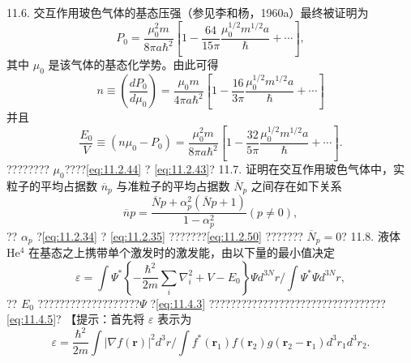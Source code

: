 11.6. 交互作用玻色气体的基态压强（参见李和杨，1960a）最终被证明为
\begin{equation}\tag{11.6.90}\label{eq:11.6.90}
P _ { 0 } = \frac { \mu _ { 0 } ^{2} m } { 8 \pi a \hbar ^{2} } \left[ 1 - \frac { 64 } { 15 \pi } \frac { \mu _ { 0 } ^{1 / 2} m ^{1 / 2} a } { \hbar } + \cdots \right] ,
\end{equation}
其中 \(\mu_{0}\) 是该气体的基态化学势。由此可得
\begin{equation}\tag{11.6.91}\label{eq:11.6.91}
n \equiv \left( { \frac { d P _ { 0 } } { d \mu _ { 0 } } } \right) = { \frac { \mu _ { 0 } m } { 4 \pi a \hbar ^{2} } } \left[ 1 - { \frac { 16 } { 3 \pi } } { \frac { \mu _ { 0 } ^{1 / 2} m ^{1 / 2} a } { \hbar } } + \cdots \right]
\end{equation}
并且
\begin{equation}\tag{11.6.92}\label{eq:11.6.92}
\frac { E _ { 0 } } { V } \equiv ( n \mu _ { 0 } - P _ { 0 } ) = \frac { \mu _ { 0 } ^{2} m } { 8 \pi a \hbar ^{2} } \left[ 1 - \frac { 32 } { 5 \pi } \frac { \mu _ { 0 } ^{1 / 2} m ^{1 / 2} a } { \hbar } + \cdots \right] .
\end{equation}
???????? \(\mu_{0}\)????\autoref{eq:11.2.44} ? \autoref{eq:11.2.43}?
11.7. 证明在交互作用玻色气体中，实粒子的平均占据数 \(\overline{n}_{p}\) 与准粒子的平均占据数 \(\overline{N}_{p}\) 之间存在如下关系
\begin{equation}\tag{11.6.93}\label{eq:11.6.93}
\overline { { n } } p = \frac { \overline { { N } } p + \alpha _ { p } ^{2} ( \overline { { N } } p + 1 ) } { 1 - \alpha _ { p } ^{2} }  ( p \neq 0 ) ,
\end{equation}
?? \(\alpha_{p}\) ?\autoref{eq:11.2.34} ? \autoref{eq:11.2.35} ???????\autoref{eq:11.2.50} ??????? \(\overline{N}_{p}=0\)?
11.8. 液体 He\(^{4}\) 在基态之上携带单个激发时的激发能，由以下量的最小值决定
\begin{equation}\tag{11.6.94}\label{eq:11.6.94}
\varepsilon = \int \Psi ^{*} \left\{ - \frac { \hbar ^{2} } { 2 m } \sum _ { i } \nabla _ { i } ^{2} + V - E _ { 0 } \right\} \Psi d ^{3 N} r \Big / \int \Psi ^{*} \Psi d ^{3 N} r ,
\end{equation}
?? \(E_{0}\) ???????????????????\(\Psi\) ?\autoref{eq:11.4.3} ?????????????????????????????????\autoref{eq:11.4.5}?
【提示：首先将 \(\varepsilon\) 表示为
\begin{equation}\tag{11.6.95}\label{eq:11.6.95}
\varepsilon = \frac { \hbar ^{2} } { 2 m } \int | \nabla f ( \pmb { r } ) | ^{2} d ^{3} r \Bigg / \int f ^{*} ( \pmb { r } _ { 1 } ) f ( \pmb { r } _ { 2 } ) g ( \pmb { r } _ { 2 } - \pmb { r } _ { 1 } ) d ^{3} r _ { 1 } d ^{3} r _ { 2 } .
\end{equation}
